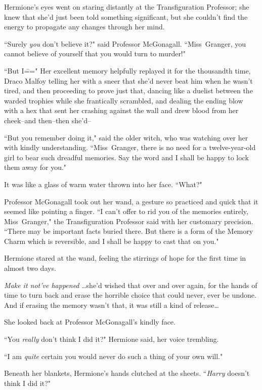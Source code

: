 Hermione's eyes went on staring distantly at the Transfiguration Professor; she knew that she'd just been told something significant, but she couldn't find the energy to propagate any changes through her mind.

``Surely \emph{you} don't believe it?" said Professor McGonagall. ``Miss~Granger, you cannot believe of yourself that you would turn to murder!"

``But I\===" Her excellent memory helpfully replayed it for the thousandth time, Draco Malfoy telling her with a sneer that she'd never beat him when he wasn't tired, and then proceeding to prove just that, dancing like a duelist between the warded trophies while she frantically scrambled, and dealing the ending blow with a hex that sent her crashing against the wall and drew blood from her cheek\---and then\---then she'd\---

``But you remember doing it," said the older witch, who was watching over her with kindly understanding. ``Miss~Granger, there is no need for a twelve-year-old girl to bear such dreadful memories. Say the word and I shall be happy to lock them away for you."

It was like a glass of warm water thrown into her face. ``What?"

Professor McGonagall took out her wand, a gesture so practiced and quick that it seemed like pointing a finger. ``I can't offer to rid you of the memories entirely, Miss~Granger," the Transfiguration Professor said with her customary precision. ``There may be important facts buried there. But there is a form of the Memory Charm which is reversible, and I shall be happy to cast that on you."

Hermione stared at the wand, feeling the stirrings of hope for the first time in almost two days.

\emph{Make it not've happened} {\ldots}she'd wished that over and over again, for the hands of time to turn back and erase the horrible choice that could never, ever be undone. And if erasing the memory wasn't that, it was still a kind of release{\ldots}

She looked back at Professor McGonagall's kindly face.

``You \emph{really} don't think I did it?" Hermione said, her voice trembling.

``I am \emph{quite} certain you would never do such a thing of your own will."

Beneath her blankets, Hermione's hands clutched at the sheets. ``\emph{Harry} doesn't think I did it?"

